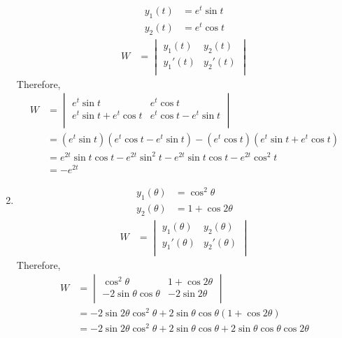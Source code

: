 \documentclass[fleqn, a4paper, 11pt, oneside]{amsart}
\theoremstyle{definition}
\theoremstyle{theorem}
\begin{document}
\begin{solution}
\begin{enumerate}[leftmargin = *]
			\begin{align*}
				y_1(t) & = e^t \sin t \\
				y_2(t) & = e^t \cos t
			\end{align*}
			\begin{align*}
				W &=
					\begin{vmatrix}
						y_1(t)    & y_2(t)    \\
						{y_1}'(t) & {y_2}'(t) \\
					\end{vmatrix}
			\end{align*}
			Therefore,
			\begin{align*}
				W &=
					\begin{vmatrix}
						e^t \sin t              & e^t \cos t              \\
						e^t \sin t + e^t \cos t & e^t \cos t - e^t \sin t \\
					\end{vmatrix}\\
				  &= \left( e^t \sin t \right) \left( e^t \cos t - e^t \sin t \right) - \left( e^t \cos t \right) \left( e^t \sin t + e^t \cos t \right)\\
				  &= e^{2 t} \sin t \cos t - e^{2 t} \sin^2 t - e^{2 t} \sin t \cos t - e^{2 t} \cos^2 t\\
				  &= -e^{2 t}
			\end{align*}
		\item
			\begin{align*}
				y_1(\theta) & = \cos^2 \theta \\
				y_2(\theta) & = 1 + \cos 2 \theta
			\end{align*}
			\begin{align*}
				W &=
					\begin{vmatrix}
						y_1(\theta)    & y_2(\theta)    \\
						{y_1}'(\theta) & {y_2}'(\theta) \\
					\end{vmatrix}
			\end{align*}
			Therefore,
			\begin{align*}
				W &=
					\begin{vmatrix}
						\cos^2 \theta              & 1 + \cos 2 \theta \\
						-2 \sin \theta \cos \theta & -2 \sin 2 \theta  \\
					\end{vmatrix}\\
				  &= -2 \sin 2 \theta \cos^2 \theta + 2 \sin \theta \cos \theta (1 + \cos 2 \theta)\\
				  &= -2 \sin 2 \theta \cos^2 \theta + 2 \sin \theta \cos \theta + 2 \sin \theta \cos \theta \cos 2 \theta
			\end{align*}
	\end{enumerate}
\end{solution}
\end{document}
